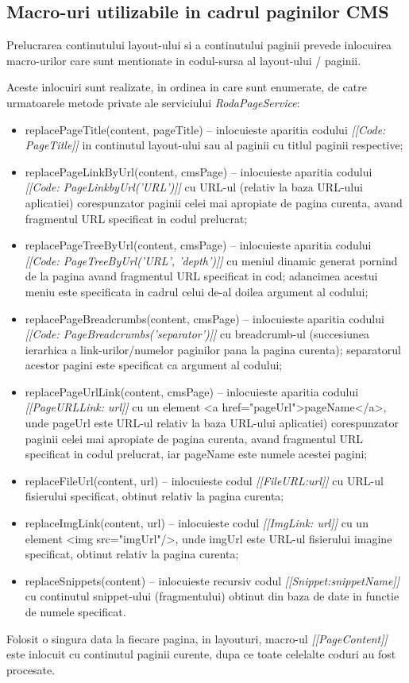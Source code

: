 \subsection{Macro-uri utilizabile in cadrul paginilor CMS}

Prelucrarea continutului layout-ului si a continutului paginii prevede inlocuirea macro-urilor care sunt mentionate in codul-sursa al layout-ului / paginii.

Aceste inlocuiri sunt realizate, in ordinea in care sunt enumerate, de catre urmatoarele metode private ale serviciului \emph{RodaPageService}:
\begin{itemize}
\item{replacePageTitle(content, pageTitle) -- 
inlocuieste aparitia codului \emph{[[Code: PageTitle]]} in continutul layout-ului sau al paginii cu titlul paginii respective;}
\item{replacePageLinkByUrl(content, cmsPage) -- 
inlocuieste aparitia codului \emph{[[Code: PageLinkbyUrl('URL')]]} cu URL-ul (relativ la baza URL-ului aplicatiei) corespunzator paginii celei mai apropiate de pagina curenta, avand fragmentul URL specificat in codul prelucrat;} 
\item{replacePageTreeByUrl(content, cmsPage) -- 
inlocuieste aparitia codului \emph{[[Code: PageTreeByUrl('URL', 'depth')]]} cu meniul dinamic generat pornind de la pagina avand fragmentul URL specificat in cod; adancimea acestui meniu este specificata in cadrul celui de-al doilea argument al codului;}
\item{replacePageBreadcrumbs(content, cmsPage) -- 
inlocuieste aparitia codului \emph{[[Code: PageBreadcrumbs('separator')]]} cu breadcrumb-ul (succesiunea ierarhica a link-urilor/numelor paginilor pana la pagina curenta); separatorul acestor pagini este specificat ca argument al codului;}
\item{replacePageUrlLink(content, cmsPage) -- 
inlocuieste aparitia codului \emph{[[PageURLLink: url]]} cu un element <a href="pageUrl">pageName</a>, unde pageUrl este URL-ul relativ la baza URL-ului aplicatiei) corespunzator paginii celei mai apropiate de pagina curenta, avand fragmentul URL specificat in codul prelucrat, iar pageName este numele acestei pagini;}
\item{replaceFileUrl(content, url) -- 
inlocuieste codul \emph{[[FileURL:url]]} cu URL-ul fisierului specificat, obtinut relativ la pagina curenta;}
\item{replaceImgLink(content, url) -- 
inlocuieste codul \emph{[[ImgLink: url]]} cu un element <img src="imgUrl"/>, unde imgUrl este URL-ul fisierului imagine specificat, obtinut relativ la pagina curenta;}
\item{replaceSnippets(content) -- 
inlocuieste recursiv codul \emph{[[Snippet:snippetName]]} cu continutul snippet-ului (fragmentului) obtinut din baza de date in functie de numele specificat.}
\end{itemize}

Folosit o singura data la fiecare pagina, in layouturi, macro-ul \emph{[[PageContent]]} este inlocuit cu continutul paginii curente, dupa ce toate celelalte coduri au fost procesate. 

\bigskip


